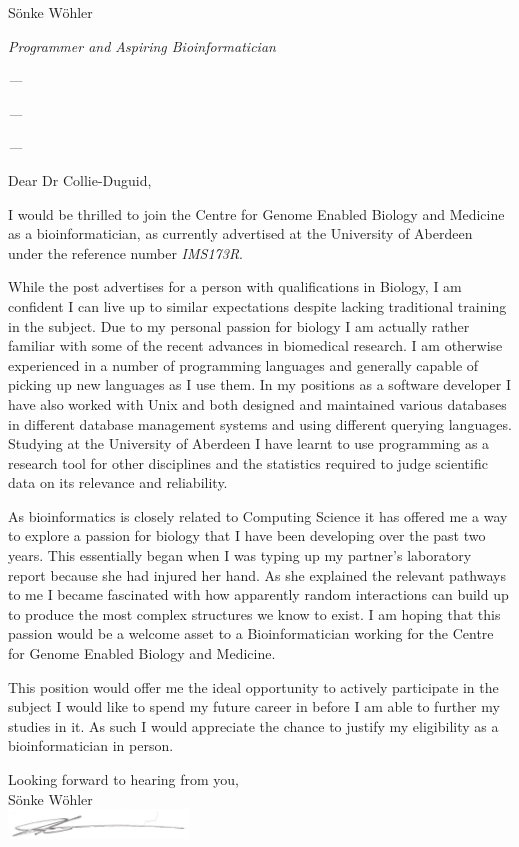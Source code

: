 \documentclass[paper=a4,fontsize=11pt]{scrartcl} %
\newcommand{\sepspace}{\vspace*{1em}}		%
\newcommand{\MyName}[1]{ %
  \Huge \usefont{OT1}{phv}{b}{n} \hfill #1
  \par \normalsize \normalfont}
\newcommand{\MySlogan}[4]{ %
  \large \usefont{OT1}{phv}{m}{n}\hfill \textit{#1} 
  \sepspace
  \par \normalsize \usefont{OT1}{phv}{m}{n}\hfill \textit{#2}
  \par \normalsize \usefont{OT1}{phv}{m}{n}\hfill \textit{#3}
  \par \normalsize \usefont{OT1}{phv}{m}{n}\hfill \textit{#4}
  \par \normalsize \normalfont}
\begin{document}
  
  \MyName{S\"onke W\"ohler}
  \MySlogan{Programmer and Aspiring Bioinformatician}{---}{---}{---}
 \sepspace\sepspace
  
  \noindent
  Dear Dr Collie-Duguid,
    
  \sepspace
  
    \noindent
    I would be thrilled to join the Centre for Genome Enabled Biology and Medicine as a bioinformatician, as currently advertised at the University of Aberdeen under the reference number \textit{IMS173R}.
    \sepspace
    
    \noindent
    While the post advertises for a person with qualifications in Biology, I am confident I can live up to similar expectations despite lacking traditional training in the subject. Due to my personal passion for biology I am actually rather familiar with some of the recent advances in biomedical research. I am otherwise experienced in a number of programming languages and generally capable of picking up new languages as I use them. In my positions as a software developer I have also worked with Unix and both designed and maintained various databases in different database management systems and using different querying languages. Studying at the University of Aberdeen I have learnt to use programming as a research tool for other disciplines and the statistics required to judge scientific data on its relevance and reliability.
    \sepspace
    
    \noindent
    As bioinformatics is closely related to Computing Science it has offered me a way to explore a passion for biology that I have been developing over the past two years. This essentially began when I was typing up my partner's laboratory report because she had injured her hand. As she explained the relevant pathways to me I became fascinated with how apparently random interactions can build up to produce the most complex structures we know to exist. I am hoping that this passion would be a welcome asset to a Bioinformatician working for the Centre for Genome Enabled Biology and Medicine.
    \sepspace
    
    \noindent
    This position would offer me the ideal opportunity to actively participate in the subject I would like to spend my future career in before I am able to further my studies in it. As such I would appreciate the chance to justify my eligibility as a bioinformatician in person.
    \sepspace
    

  \sepspace
  
  \noindent
  Looking forward to hearing from you, \\
  S\"onke W\"ohler \\
 
  
  \includegraphics[height=0.78cm]{sonkiSignature}
  
\end{document}
